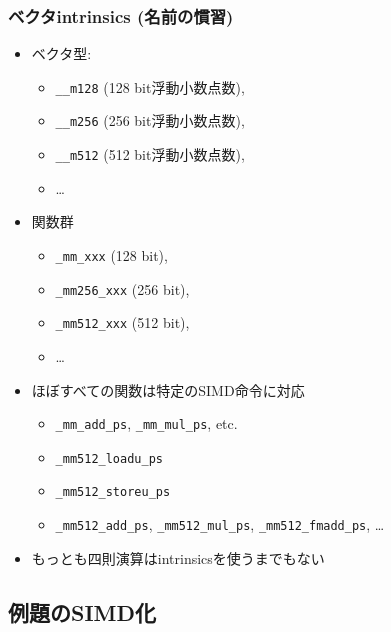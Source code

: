 \documentclass[10pt,dvipdfmx]{beamer}
\begin{document}
\begin{frame}[fragile]
\frametitle{ベクタintrinsics (名前の慣習)}
\begin{itemize}
\item ベクタ型:
  \begin{itemize}
  \item {\tt \_\_m128} (128 bit浮動小数点数), 
  \item {\tt \_\_m256} (256 bit浮動小数点数),
  \item {\tt \_\_m512} (512 bit浮動小数点数),
  \item \ldots 
  \end{itemize}

\item 関数群
  \begin{itemize}
  \item {\tt \_mm\_xxx} (128 bit),
  \item {\tt \_mm256\_xxx} (256 bit),
  \item {\tt \_mm512\_xxx} (512 bit),
  \item \ldots
  \end{itemize}

\item ほぼすべての関数は特定のSIMD命令に対応
  \begin{itemize}
  \item {\tt \_mm\_add\_ps}, {\tt \_mm\_mul\_ps}, etc.
  \item {\tt \_mm512\_loadu\_ps}
  \item {\tt \_mm512\_storeu\_ps}
  \item {\tt \_mm512\_add\_ps}, {\tt \_mm512\_mul\_ps}, {\tt \_mm512\_fmadd\_ps}, \ldots
  \end{itemize}
  
\item もっとも四則演算はintrinsicsを使うまでもない
\end{itemize}
\end{frame}

\subsection{例題のSIMD化}
\end{document}
